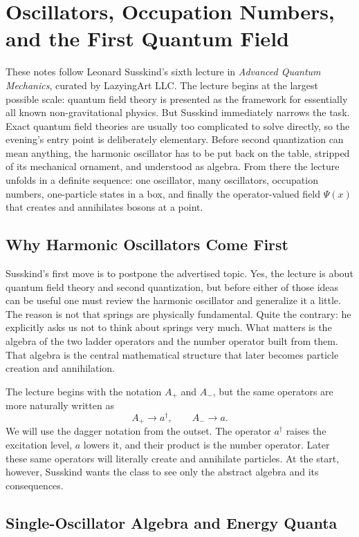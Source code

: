 \chapter{Oscillators, Occupation Numbers, and the First Quantum Field}

These notes follow Leonard Susskind's sixth lecture in \emph{Advanced Quantum Mechanics}, curated by LazyingArt LLC. The lecture begins at the largest possible scale: quantum field theory is presented as the framework for essentially all known non-gravitational physics. But Susskind immediately narrows the task. Exact quantum field theories are usually too complicated to solve directly, so the evening's entry point is deliberately elementary. Before second quantization can mean anything, the harmonic oscillator has to be put back on the table, stripped of its mechanical ornament, and understood as algebra. From there the lecture unfolds in a definite sequence: one oscillator, many oscillators, occupation numbers, one-particle states in a box, and finally the operator-valued field \(\Psi(x)\) that creates and annihilates bosons at a point.

\section{Why Harmonic Oscillators Come First}

Susskind's first move is to postpone the advertised topic. Yes, the lecture is about quantum field theory and second quantization, but before either of those ideas can be useful one must review the harmonic oscillator and generalize it a little. The reason is not that springs are physically fundamental. Quite the contrary: he explicitly asks us not to think about springs very much. What matters is the algebra of the two ladder operators and the number operator built from them. That algebra is the central mathematical structure that later becomes particle creation and annihilation.

The lecture begins with the notation \(A_+\) and \(A_-\), but the same operators are more naturally written as
\[
A_+ \to a^\dagger,
\qquad
A_- \to a.
\]
We will use the dagger notation from the outset. The operator \(a^\dagger\) raises the excitation level, \(a\) lowers it, and their product is the number operator. Later these same operators will literally create and annihilate particles. At the start, however, Susskind wants the class to see only the abstract algebra and its consequences.

\section{Single-Oscillator Algebra and Energy Quanta}


